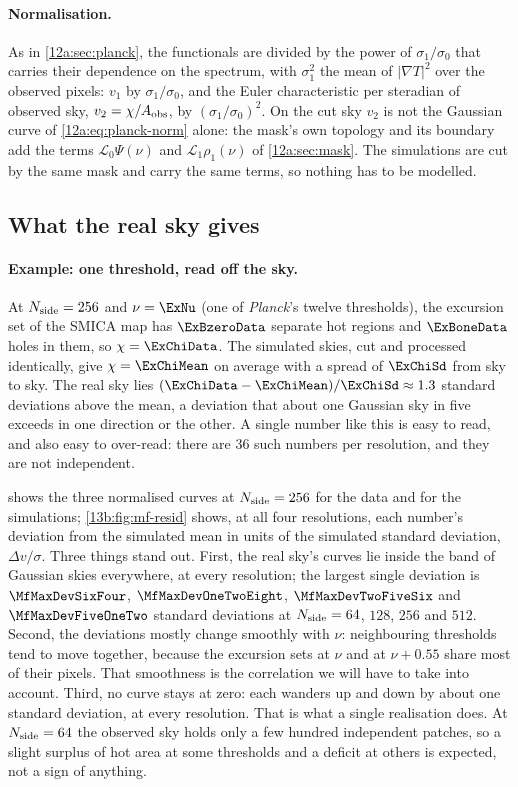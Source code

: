 \paragraph{Normalisation.} As in \cref{12a:sec:planck}, the functionals are divided by the power of
$\sigma_1/\sigma_0$ that carries their dependence on the spectrum, with $\sigma_1^2$ the mean of $|\nabla T|^2$ over
the observed pixels: $v_1$ by $\sigma_1/\sigma_0$, and the Euler characteristic per steradian of observed sky,
$v_2=\chi/A_{\rm obs}$, by $(\sigma_1/\sigma_0)^2$. On the cut sky $v_2$ is not the Gaussian curve of
\eqref{12a:eq:planck-norm} alone: the mask's own topology and its boundary add the terms $\mathcal L_0\Psi(\nu)$ and
$\mathcal L_1\rho_1(\nu)$ of \cref{12a:sec:mask}. The simulations are cut by the same mask and carry the same terms,
so nothing has to be modelled.

\subsection{What the real sky gives}
\label{13b:sec:mf-results}

\paragraph{Example: one threshold, read off the sky.} At $N_{\rm side}=256$ and $\nu=\ExNu$ (one of \textit{Planck}'s twelve
thresholds), the excursion set of the SMICA map has $\ExBzeroData$ separate hot regions and $\ExBoneData$ holes in them,
so $\chi=\ExChiData$. The simulated skies, cut and processed identically, give $\chi=\ExChiMean$ on average with a
spread of $\ExChiSd$ from sky to sky. The real sky lies $(\ExChiData-\ExChiMean)/\ExChiSd\approx1.3$ standard deviations above the
mean, a deviation that about one Gaussian sky in five exceeds in one direction or the other. A single number like this is
easy to read, and also easy to over-read: there are $36$ such numbers per resolution, and they are not independent.

 shows the three normalised curves at $N_{\rm side}=256$ for the data and for the
simulations; \cref{13b:fig:mf-resid} shows, at all four resolutions, each number's deviation from the simulated mean
in units of the simulated standard deviation, $\Delta v/\sigma$. Three things stand out. First, the real sky's
curves lie inside the band of Gaussian skies everywhere, at every resolution; the largest single deviation is
$\MfMaxDevSixFour$, $\MfMaxDevOneTwoEight$, $\MfMaxDevTwoFiveSix$ and $\MfMaxDevFiveOneTwo$ standard deviations at
$N_{\rm side}=64$, $128$, $256$ and $512$. Second, the deviations mostly change smoothly with $\nu$: neighbouring
thresholds tend to move together, because the excursion sets at $\nu$ and at $\nu+0.55$ share most of their pixels. That
smoothness is the correlation we will have to take into account. Third, no curve stays at zero: each wanders up and
down by about one standard deviation, at every resolution. That is what a single realisation does. At
$N_{\rm side}=64$ the observed sky holds only a few hundred independent patches, so a slight surplus of hot area
at some thresholds and a deficit at others is expected, not a sign of anything.

